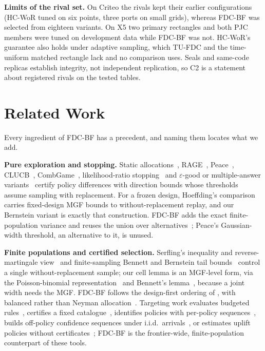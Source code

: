\documentclass[sigconf,anonymous,review]{acmart}
\newcommand{\eps}{\varepsilon}
\begin{document}
\textbf{Limits of the rival set.} On Criteo the rivals kept their earlier configurations (HC-WoR tuned on six points, three ports on small grids), whereas FDC-BF was selected from eighteen variants. On X5 two primary rectangles and both PJC members were tuned on development data while FDC-BF was not. HC-WoR's guarantee also holds under adaptive sampling, which TU-FDC and the time-uniform matched rectangle lack and no comparison uses. Seals and same-code replicas establish integrity, not independent replication, so C2 is a statement about registered rivals on the tested tables.

\section{Related Work}\label{sec:related}

Every ingredient of FDC-BF has a precedent, and naming them locates what we add.

\textbf{Pure exploration and stopping.} Static allocations~\citep{soare2014best}, RAGE~\citep{fiez2019sequential}, Peace~\citep{katzsamuels2020empirical}, CLUCB~\citep{chen2014combinatorial,chen2017nearly}, CombGame~\citep{jourdan2021efficient}, likelihood-ratio stopping~\citep{garivier2016optimal} and $\eps$-good or multiple-answer variants~\citep{degenne2019pure,jourdan2022choosing,jamieson2018bandit} certify policy differences with direction bounds whose thresholds assume sampling with replacement. For a frozen design, Hoeffding's comparison~\citep{hoeffding1963probability} carries fixed-design MGF bounds to without-replacement replay, and our Bernstein variant is exactly that construction. FDC-BF adds the exact finite-population variance and reuses the union over alternatives~\citep{deheide2026union}; Peace's Gaussian-width threshold, an alternative to it, is unused.

\textbf{Finite populations and certified selection.} Serfling's inequality and reverse-martingale view~\citep{serfling1974probability,bardenet2015concentration} and finite-sampling Bennett and Bernstein tail bounds~\citep{greene2017exponential} control a single without-replacement sample; our cell lemma is an MGF-level form, via the Poisson-binomial representation~\citep{vatutin1982limit,tang2023poisson} and Bennett's lemma~\citep{bennett1962probability}, because a joint width needs the MGF. FDC-BF follows the design-first ordering of \citet{hait2026target}, with balanced rather than Neyman allocation~\citep{neyman1934two,kato2024generalized,dang2026target}. Targeting work evaluates budgeted rules~\citep{imai2023experimental,li2024neyman}, certifies a fixed catalogue~\citep{shekhar2026support}, identifies policies with per-policy sequences~\citep{molitor2026anytime}, builds off-policy confidence sequences under i.i.d.\ arrivals~\citep{karampatziakis2021off,waudbysmith2024anytime,thomas2015high,cho2024cspimt}, or estimates uplift policies without certificates~\citep{sverdrup2023qini,athey2021policy}; FDC-BF is the frontier-wide, finite-population counterpart of these tools.
\end{document}
